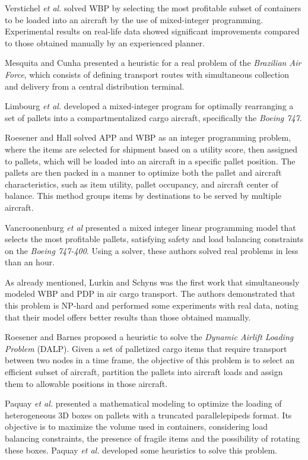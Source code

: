 \documentclass[preprint]{elsarticle}
\begin{document}
Verstichel {\it et al.} \cite{Verstichel2011} solved WBP by selecting the most profitable subset of containers to be loaded into an aircraft by the use of mixed-integer programming. Experimental results on real-life data showed significant improvements compared to those obtained manually by an experienced planner.

Mesquita and Cunha \cite{MesquitaCunha2011} presented a heuristic for a real problem of the {\it Brazilian Air Force}, which consists of defining transport routes with simultaneous collection and delivery from a central distribution terminal.

Limbourg {\it et al.} \cite{Limbourg2012} developed a mixed-integer program for optimally rearranging a set of pallets into a compartmentalized cargo aircraft, specifically the {\it Boeing 747}.

Roesener and Hall \cite{RoesenerHall2014} solved APP and WBP as an integer programming problem, where the items are selected for shipment based on a utility score, then assigned to pallets, which will be loaded into an aircraft in a specific pallet position.
The pallets are then packed in a manner to optimize both the pallet and aircraft characteristics, such as item utility, pallet occupancy, and aircraft center of balance.
This method groups items by destinations to be served by multiple aircraft.

Vancroonenburg {\it et al} \cite{Vancroonenburg2014} presented a mixed integer linear programming model that selects the most profitable pallets, satisfying safety and load balancing constraints on the {\it Boeing 747-400}. Using a solver, these authors solved real problems in less than an hour.

As already mentioned, Lurkin and Schyns \cite{LurkinSchyns2015} was the first work that simultaneously modeled WBP and PDP in air cargo transport. The authors demonstrated that this problem is NP-hard and performed some experiments with real data, noting that their model offers better results than those obtained manually.

Roesener and Barnes \cite{RoesenerBarnes2016} proposed a heuristic to solve the {\it Dynamic Airlift Loading Problem} (DALP). Given a set of palletized cargo items that require transport between two nodes in a time frame, the objective of this problem is to select an efficient subset of aircraft, partition the pallets into aircraft loads and assign them to allowable positions in those aircraft.

Paquay {\it et al.} \cite{PaquaySchynsLimbourg2016} presented a mathematical modeling to optimize the loading of heterogeneous 3D boxes on pallets with a truncated parallelepipeds format. Its objective is to maximize the volume used in containers, considering load balancing constraints, the presence of fragile items and the possibility of rotating these boxes. Paquay {\it et al.} \cite{PaquayLimbourgSchynsOliveira2018} developed some heuristics to solve this problem.
\end{document}
